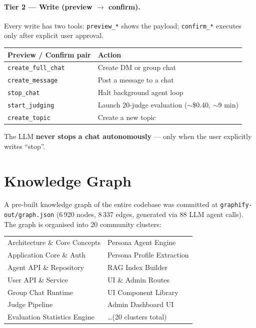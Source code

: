 \documentclass[12pt,a4paper]{article}
\begin{document}
\paragraph{Tier 2 --- Write (preview $\to$ confirm).}
Every write has two tools: \texttt{preview\_*} shows the payload; \texttt{confirm\_*}
executes only after explicit user approval.

\begin{tabular}{@{}ll@{}}
\toprule
\textbf{Preview / Confirm pair} & \textbf{Action} \\
\midrule
\texttt{create\_full\_chat} & Create DM or group chat \\
\texttt{create\_message}    & Post a message to a chat \\
\texttt{stop\_chat}         & Halt background agent loop \\
\texttt{start\_judging}     & Launch 20-judge evaluation ($\sim$\$0.40, $\sim$9 min) \\
\texttt{create\_topic}      & Create a new topic \\
\bottomrule
\end{tabular}

The LLM \textbf{never stops a chat autonomously} --- only when the user explicitly writes ``stop''.

\section{Knowledge Graph}

A pre-built knowledge graph of the entire codebase was committed at
\texttt{graphify-out/graph.json} (6\,920 nodes, 8\,337 edges, generated via 88 LLM agent
calls). The graph is organised into 20 community clusters:

\begin{tabular}{@{}ll@{}}
  Architecture \& Core Concepts & Persona Agent Engine \\
  Application Core \& Auth      & Persona Profile Extraction \\
  Agent API \& Repository       & RAG Index Builder \\
  User API \& Service           & UI \& Admin Routes \\
  Group Chat Runtime            & UI Component Library \\
  Judge Pipeline                & Admin Dashboard UI \\
  Evaluation Statistics Engine  & \ldots (20 clusters total) \\
\end{tabular}
\end{document}
